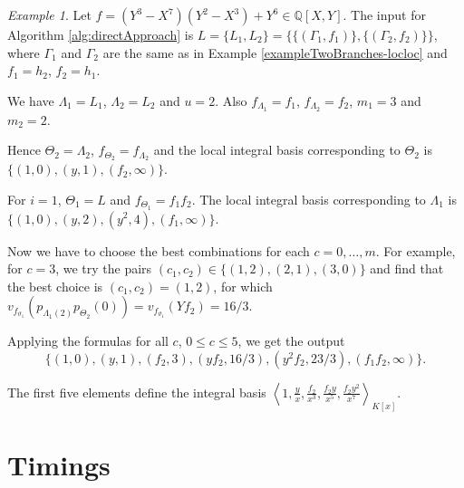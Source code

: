 \documentclass[a4paper,11pt]{amsart}%
\theoremstyle{definition}
\theoremstyle{plain}
\theoremstyle{remark}
\newtheorem{example}[defn]{Example}
\begin{document}
\begin{example}
Let $f = (Y^{3}-X^{7})(Y^{2} - X^{3})+Y^{6} \in{\mathbb{Q}}[X,Y]$. The input
for Algorithm \ref{alg:directApproach} is $L = \{L_{1}, L_{2}\} =
\{\{(\varGamma_{1}, f_{1})\}, \{(\varGamma_{2}, f_{2})\}\}$, where
$\varGamma_{1}$ and $\varGamma_{2}$ are the same as in Example
\ref{exampleTwoBranches-locloc} and $f_{1} = h_{2}$, $f_{2} = h_{1}$.

We have $\Lambda_{1} = L_{1}$, $\Lambda_{2} = L_{2}$ and $u = 2$. Also
$f_{\Lambda_{1}} = f_{1}$, $f_{\Lambda_{2}} = f_{2}$, $m_{1} = 3$ and $m_{2} =
2$.

Hence $\varTheta_{2} = \Lambda_{2}$, $f_{\varTheta_{2}} = f_{\Lambda_{2}}$ and
the local integral basis corresponding to $\varTheta_{2}$ is $\{(1, 0), (y,
1), (f_{2}, \infty)\}$.

For $i = 1$, $\varTheta_{1} = L$ and $f_{\varTheta_{1}} = f_{1}f_{2}$. The
local integral basis corresponding to $\varLambda_{1}$ is $\{(1, 0), (y, 2),
(y^{2}, 4), (f_{1}, \infty)\}$.

Now we have to choose the best combinations for each $c = 0, \dots, m$. For
example, for $c = 3$, we try the pairs $(c_{1}, c_{2}) \in\{(1,2), (2,1), (3,
0)\}$ and find that the best choice is $(c_{1}, c_{2}) = (1,2)$, for which
$v_{f_{\vartheta_{1}}}(p_{\Lambda_{1}(2)}p_{\varTheta_{2}}(0)) =
v_{f_{\vartheta_{1}}}(Y f_{2}) = 16/3$.

Applying the formulas for all $c$, $0 \leq c \leq5$, we get the output
\[
\{(1, 0), (y, 1), (f_{2}, 3), (y f_{2}, 16/3), (y^{2} f_{2}, 23/3), (f_{1}
f_{2}, \infty)\}.
\]


The first five elements define the integral basis $\left\langle 1, \frac{y}%
{x}, \frac{f_{2}}{x^{3}}, \frac{f_{2}y}{x^{5}}, \frac{f_{2}y^{2}}{x^{7}%
}\right\rangle _{K[x]}$.
\end{example}



\section{Timings}
\end{document}
